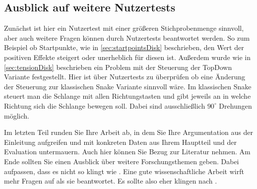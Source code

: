 \subsection{Ausblick auf weitere Nutzertests}
Zunächst ist hier ein Nutzertest mit einer größeren Stichprobenmenge sinnvoll, aber auch weitere Fragen können durch Nutzertests beantwortet werden. So zum Beispiel ob Startpunkte, wie in \ref{sec:startpointsDisk} beschrieben, den Wert der positiven Effekte steigert oder unerheblich für diesen ist. Außerdem wurde wie in \ref{sec:tensionDisk} beschrieben ein Problem mit der Steuerung der TopDown Variante festgestellt. Hier ist über Nutzertests zu überprüfen ob eine Änderung der Steuerung zur klassischen Snake Variante sinnvoll wäre. Im klassischen Snake steuert man die Schlange mit allen Richtungstasten und gibt jeweils an in welche Richtung sich die Schlange bewegen soll. Dabei sind ausschließlich $90^\circ$ Drehungen möglich.




Im letzten Teil runden Sie Ihre Arbeit ab, in dem Sie Ihre Argumentation aus der Einleitung aufgreifen und mit konkreten Daten aus Ihrem Hauptteil und der Evaluation untermauern. Auch hier können Sie Bezug zur Literatur nehmen. Am Ende sollten Sie einen Ausblick über weitere Forschungsthemen geben. Dabei aufpassen, dass es nicht so klingt wie . Eine gute wissenschaftliche Arbeit wirft mehr Fragen auf als sie beantwortet. Es sollte also eher klingen nach .